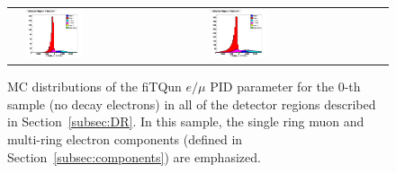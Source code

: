 \begin{figure}[h!]
\begin{tabular}{l  l  l}
  &\includegraphics[width=0.33\textwidth]{plots/mc_breakdown_comp_1_bin_4_att_0} 
  &\includegraphics[width=0.33\textwidth]{plots/mc_breakdown_comp_1_bin_5_att_0} 
\end{tabular} 
\caption{MC distributions of the fiTQun $e/\mu$ PID parameter for the $0$-th
sample (no decay electrons) in all of the detector regions described in
Section~\ref{subsec:DR}.  In this sample, the single ring muon and multi-ring
electron components (defined in Section~\ref{subsec:components}) are
emphasized.}
\end{figure}

